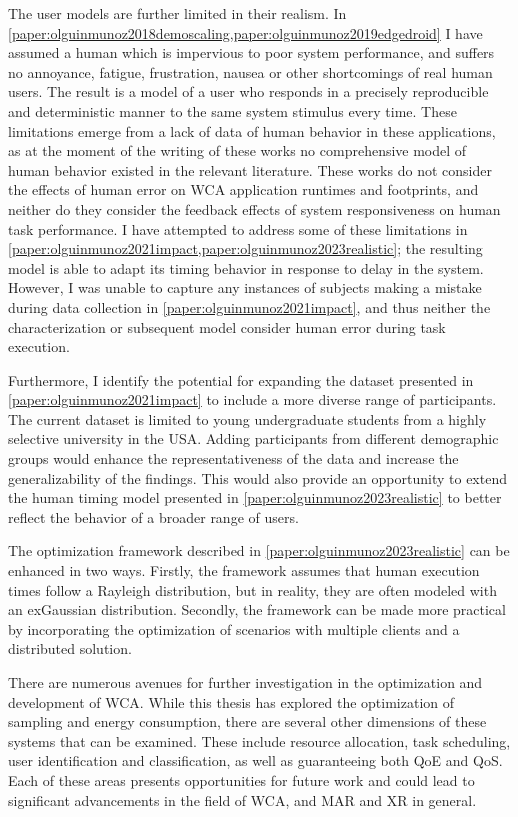 The user models are further limited in their realism.
In \cref{paper:olguinmunoz2018demoscaling,paper:olguinmunoz2019edgedroid} I have assumed a human which is impervious to poor system performance, and suffers no annoyance, fatigue, frustration, nausea or other shortcomings of real human users.
The result is a model of a user who responds in a precisely reproducible and deterministic manner to the same system stimulus every time.
These limitations emerge from a lack of data of human behavior in these applications, as at the moment of the writing of these works no comprehensive model of human behavior existed in the relevant literature.
These works do not consider the effects of human error on \gls{WCA} application runtimes and footprints, and neither do they consider the feedback effects of system responsiveness on human task performance.
I have attempted to address some of these limitations in \cref{paper:olguinmunoz2021impact,paper:olguinmunoz2023realistic};
the resulting model is able to adapt its timing behavior in response to delay in the system.
However, I was unable to capture any instances of subjects making a mistake during data collection in \cref{paper:olguinmunoz2021impact}, and thus neither the characterization or subsequent model consider human error during task execution.

Furthermore, I identify the potential for expanding the dataset presented in \cref{paper:olguinmunoz2021impact} to include a more diverse range of participants.
The current dataset is limited to young undergraduate students from a highly selective university in the \gls{USA}.
Adding participants from different demographic groups would enhance the representativeness of the data and increase the generalizability of the findings.
This would also provide an opportunity to extend the human timing model presented in \cref{paper:olguinmunoz2023realistic} to better reflect the behavior of a broader range of users.

The optimization framework described in \cref{paper:olguinmunoz2023realistic} can be enhanced in two ways.
Firstly, the framework assumes that human execution times follow a Rayleigh distribution, but in reality, they are often modeled with an \gls{exGaussian} distribution.
Secondly, the framework can be made more practical by incorporating the optimization of scenarios with multiple clients and a distributed solution.

There are numerous avenues for further investigation in the optimization and development of \gls{WCA}.
While this thesis has explored the optimization of sampling and energy consumption, there are several other dimensions of these systems that can be examined.
These include resource allocation, task scheduling, user identification and classification, as well as guaranteeing both \gls{QoE} and \gls{QoS}.
Each of these areas presents opportunities for future work and could lead to significant advancements in the field of \gls{WCA}, and \gls{MAR} and \gls{XR} in general.

